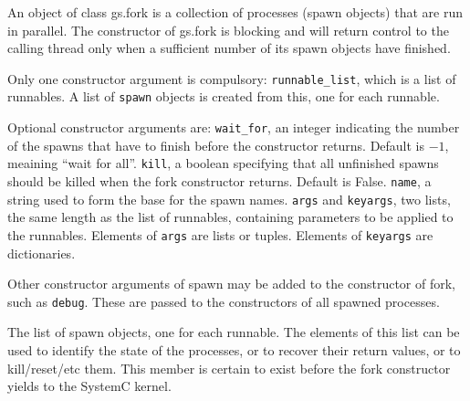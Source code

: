 \documentclass[12pt,oneside]{gsbook}
\begin{document}
 {An object of class gs.fork is a collection of
processes (spawn objects) that are run in parallel.  The constructor
of gs.fork is blocking and will return control to the calling
thread only when a sufficient number of its spawn objects have
finished.

Only one constructor argument is compulsory: \texttt{runnable\_list},
which is a list of runnables.  A list of \texttt{spawn} objects is
created from this, one for each runnable.

Optional constructor arguments are:
\texttt{wait\_for}, an integer indicating the number of the spawns
that have to finish before the constructor returns.  Default is $-1$,
meaining ``wait for all''.
\texttt{kill}, a boolean specifying that all unfinished spawns should
be killed when the fork constructor returns.  Default is False.
\texttt{name}, a string used to form the base for the spawn names.
\texttt{args} and \texttt{keyargs}, two lists, the same length as the
list of runnables, containing parameters to be applied to the
runnables.  Elements of \texttt{args} are lists or tuples.  Elements
of \texttt{keyargs} are dictionaries.

Other constructor arguments of spawn may be added to the constructor
of fork, such as \texttt{debug}.  These are passed to the constructors
of all spawned processes.
}

\begin{members}
 {The list of spawn objects, one for each runnable.
The elements of this list can be used to identify the state of
the processes, or to recover their return values, or to kill/reset/etc
them.  This member is certain to exist before the fork constructor
yields to the SystemC kernel.}
\end{members}
\end{document}

